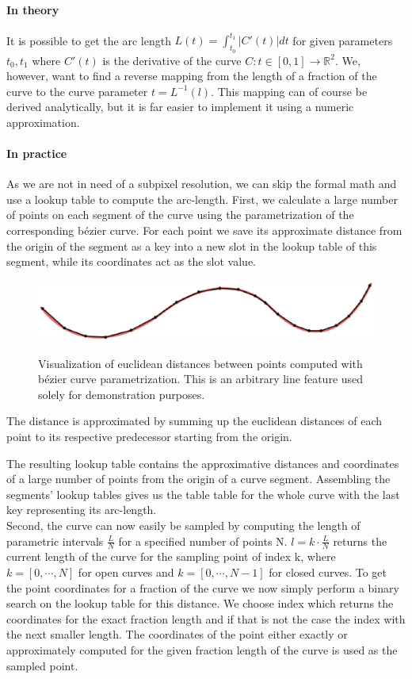 \paragraph{In theory}
It is possible to get the arc length $L(t)=\int_{t_{0}}^{t_{1}} \left|C'(t)\right| dt$ for given parameters $t_{0}, t_{1}$ where $C'(t)$ is the derivative of the curve $C:t \in [0,1] \rightarrow \mathbb{R}^2$. We, however, want to find a reverse mapping from the length of a fraction of the curve to the curve parameter $t = L^{-1}(l)$. 
This mapping can of course be derived analytically, but it is far easier to implement it using a numeric approximation. 

\paragraph{In practice}
As we are not in need of a subpixel resolution, we can skip the formal math and use a lookup table to compute the arc-length.
First, we calculate a large number of points on each segment of the curve using the parametrization of the corresponding b\'{e}zier curve. For each point we save its approximate distance from the origin of the segment as a key into a new slot in the lookup table of this segment, while its coordinates act as the slot value. 
\begin{figure}[h!]
\centering
\includegraphics[width=\textwidth]{./resources/figures/lookup_table.eps}
\label{fig:lookup}
\caption{Visualization of euclidean distances between points computed with b\'{e}zier curve parametrization. This is an arbitrary line feature used solely for demonstration purposes.}
\end{figure}
The distance is approximated by summing up the euclidean distances of each point to its respective predecessor starting from the origin.

The resulting lookup table contains the approximative distances and coordinates of a large number of points from the origin of a curve segment. Assembling the segments' lookup tables gives us the table table for the whole curve with the last key representing its arc-length.\\ 
Second, the curve can now easily be sampled by computing the length of parametric intervals $\frac{L}{N}$ for a specified number of points N. $l=k \cdot \frac{L}{N}$ returns the current length of the curve for the sampling point of index k, where $k=[0,\cdots,N]$ for open curves and $k=[0,\cdots,N-1]$ for closed curves.
To get the point coordinates for a fraction of the curve we now simply perform a binary search on the lookup table for this distance. We choose index which returns the coordinates for the exact fraction length and if that is not the case the index with the next smaller length. The coordinates of the point either exactly or approximately computed for the given fraction length of the curve is used as the sampled point.

